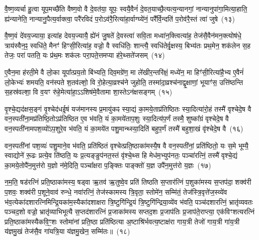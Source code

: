 {\anuvakamend[{अथ॑ ददते॒ स्वया॒ सन्थ्स्व॑धाका॒रो हि वि॑न्दति}]}

वै॒ष्ण॒व्यर्चा हु॒त्वा यूप॒मच्छै॑ति वैष्ण॒वो वै दे॒वत॑या॒ यूपः॒ स्वयै॒वैनं॑ दे॒वत॒याच्छै॒त्यत्य॒न्यानगां॒ नान्यानुपा॑गा॒मित्या॒हाति॒ ह्य॑न्यानेति॒ नान्यानु॒पैत्य॒र्वाक्त्वा॒ परै॑रविदं प॒रो\-ऽव॑रै॒रित्या॑हा॒र्वाग्घ्ये॑नं॒ परै᳚र्वि॒न्दति॑ प॒रोव॑रै॒स्तं त्वा॑ जुषे~(१३)\ip

वै॒ष्ण॒वं दे॑वय॒ज्याया॒ इत्या॑ह देवय॒ज्यायै॒ ह्ये॑नं जु॒षते॑ दे॒वस्त्वा॑ सवि॒ता मध्वा॑न॒क्त्वित्या॑ह॒ तेज॑सै॒वैन॑मन॒क्त्योष॑धे॒ त्राय॑स्वैन॒ꣴ॒ स्वधि॑ते॒ मैनꣳ॑ हिꣳसी॒रित्या॑ह॒ वज्रो॒ वै स्वधि॑तिः॒ शान्त्यै॒ स्वधि॑तेर्वृ॒क्षस्य॒ बिभ्य॑तः प्रथ॒मेन॒ शक॑लेन स॒ह तेजः॒ परा॑ पतति॒ यः प्र॑थ॒मः शक॑लः परा॒पते॒त्तमप्या ह॑रे॒थ्सते॑जसम्~(१४)\ip

ए॒वैन॒मा ह॑रती॒मे वै लो॒का यूपा᳚त्प्रय॒तो बि॑भ्यति॒ दिव॒मग्रे॑ण॒ मा ले॑खीर॒न्तरि॑क्षं॒ मध्ये॑न॒ मा हिꣳ॑सी॒रित्या॑है॒भ्य ए॒वैनं॑ लो॒केभ्यः॑ शमयति॒ वन॑स्पते श॒तव॑ल्\mbox{}शो॒ वि रो॒हेत्या॒व्रश्च॑ने जुहोति॒ तस्मा॑दा॒व्रश्च॑नाद्वृ॒क्षाणां॒ भूयाꣳ॑स॒ उत्ति॑ष्ठन्ति स॒हस्र॑वल्\mbox{}शा॒ वि व॒यꣳ रु॑हे॒मेत्या॑हा॒\-ऽऽ\-शिष॑मे॒वैतामा शा॒स्ते\-ऽन॑क्षसङ्गम्~(१५)\ip

वृ॒श्चे॒द्यद॑क्षस॒ङ्गं वृ॒श्चेद॑धई॒षं यज॑मानस्य प्र॒मायु॑कꣴ स्या॒द्यं का॒मये॒ताप्र॑तिष्ठितः स्या॒दित्या॑रो॒हं तस्मै॑ वृश्चेदे॒ष वै वन॒स्पती॑ना॒मप्र॑तिष्ठि॒तो\-ऽप्र॑तिष्ठित ए॒व भ॑वति॒ यं का॒मये॑ताप॒शुः स्या॒दित्य॑प॒र्णं तस्मै॒ शुष्का᳚ग्रं वृश्चेदे॒ष वै वन॒स्पती॑नामपश॒व्यो॑\-ऽप॒शुरे॒व भ॑वति॒ यं का॒मये॑त पशु॒मान्थ्स्या॒दिति॑ बहुप॒र्णं तस्मै॑ बहुशा॒खं वृ॑श्चेदे॒ष वै~(१६)\ip

वन॒स्पती॑नां पश॒व्यः॑ पशु॒माने॒व भ॑वति॒ प्रति॑ष्ठितं वृश्चेत्प्रति॒ष्ठाका॑मस्यै॒ष वै वन॒स्पती॑नां॒ प्रति॑ष्ठितो॒ यः स॒मे भूम्यै॒ स्वाद्योने॑ रू॒ढः प्रत्ये॒व ति॑ष्ठति॒ यः प्र॒त्यङ्ङुप॑नत॒स्तं वृ॑श्चे॒थ्स हि मेध॑म॒भ्युप॑नतः॒ पञ्चा॑रत्निं॒ तस्मै॑ वृश्चे॒द्यं का॒मये॒तोपै॑न॒मुत्त॑रो य॒ज्ञो न॑मे॒दिति॒ पञ्चा᳚क्षरा प॒ङ्क्तिः पाङ्क्तो॑ य॒ज्ञ उपै॑न॒मुत्त॑रो य॒ज्ञः~(१७)\ip

न॒म॒ति॒ षड॑रत्निं प्रति॒ष्ठाका॑मस्य॒ षड्वा ऋ॒तव॑ ऋ॒तुष्वे॒व प्रति॑ तिष्ठति स॒प्तार॑त्निं प॒शुका॑मस्य स॒प्तप॑दा॒ शक्व॑री प॒शवः॒ शक्व॑री प॒शूने॒वाव॑ रुन्धे॒ नवा॑रत्निं॒ तेज॑स्कामस्य त्रि॒वृता॒ स्तोमे॑न॒ सम्मि॑तं॒ तेज॑स्त्रि॒वृत्ते॑ज॒स्व्ये॑व भ॑व॒त्येका॑\-दशारत्नि\-मिन्द्रि॒यका॑म॒स्यैका॑\-दशाक्षरा त्रि॒ष्टुगि॑न्द्रि॒यं त्रि॒ष्टुगि॑न्द्रिया॒व्ये॑व भ॑वति॒ पञ्च॑दशारत्निं॒ भ्रातृ॑व्यवतः पञ्चद॒शो वज्रो॒ भ्रातृ॑व्याभिभूत्यै स॒प्तद॑शारत्निं प्र॒जाका॑मस्य सप्तद॒शः प्र॒जा\-प॑तिः प्र॒जा\-प॑ते॒राप्त्या॒ एक॑विꣳशत्यरत्निं प्रति॒ष्ठाका॑मस्यैक\-वि॒ꣳ॒शः स्तोमा॑नां प्रति॒ष्ठा प्रति॑ष्ठित्या अ॒ष्टाश्रि॑र्भवत्य॒ष्टाक्ष॑रा गाय॒त्री तेजो॑ गाय॒त्री गा॑य॒त्री य॑ज्ञमु॒खं तेज॑सै॒व गा॑यत्रि॒या य॑ज्ञमु॒खेन॒ सम्मि॑तः॥~(१८)\ip

